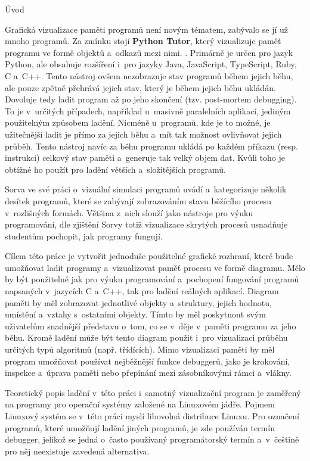 \documentclass[czech,bachelor,male,python,dept460,hidelinks]{diploma}						%
\newcommand{\parspace}[1][]{
	\ifthenelse{\isempty{#1}}{\vspace{0mm}}{\vspace{#1}}
	\par
}
\begin{document}
\begin{section}{Úvod}
	\parspace Grafická vizualizace paměti programů není novým tématem, zabývalo se jí už mnoho programů. Za zmínku stojí \textbf{Python Tutor}, který vizualizuje
	paměť programu ve formě objektů a~odkazů mezi nimi. \cite{GuoSIGCSE2013}.
	Primárně je určen pro jazyk Python, ale obsahuje rozšíření i~pro jazyky Java, JavaScript, TypeScript, Ruby, C a~C++.
	Tento nástroj ovšem nezobrazuje stav programů během jejich běhu, ale pouze zpětně přehrává jejich stav, který je během jejich běhu ukládán.
	Dovoluje tedy ladit program až po jeho skončení (tzv. post-mortem debugging). To je v~určitých případech, například u~masivně
	paralelních aplikací, jediným použitelným způsobem ladění. Nicméně u~programů, kde je to možné, je užitečnější ladit je přímo za jejich běhu a~mít
	tak možnost ovlivňovat jejich průběh. Tento nástroj navíc za běhu programu ukládá po každém příkazu (resp. instrukci) celkový stav paměti
	a~generuje tak velký objem dat. Kvůli toho je obtížné ho použít pro ladění větších a~složitějších programů.
	
	\parspace Sorva ve své práci o~vizuální simulaci programů \cite[140]{sorva2012visual} uvádí a~kategorizuje několik desítek programů,
	které se zabývají zobrazováním stavu běžícího procesu v~rozlišných formách. Většina z~nich slouží jako nástroje pro výuku programování,
	dle zjištění Sorvy totiž vizualizace skrytých procesů usnadňuje studentům pochopit, jak programy fungují. \cite[212]{sorva2012visual}
	
	\parspace Cílem této práce je vytvořit jednoduše použitelné grafické rozhraní, které bude umožňovat ladit programy a~vizualizovat paměť procesu
	ve formě diagramu. Mělo by být použitelné jak pro výuku programování a~pochopení fungování programů napsaných v~jazycích C a~C++, tak pro ladění reálných
	aplikací. Diagram paměti by měl zobrazovat jednotlivé objekty a~struktury, jejich hodnotu, umístění a~vztahy s~ostatními objekty.
	Tímto by měl poskytnout svým uživatelům snadnější představu o~tom, co se v~děje v~paměti programu za jeho běhu.
	Kromě ladění může být tento diagram použit i~pro vizualizaci průběhu určitých typů algoritmů (např. třídících). Mimo vizualizaci paměti by měl program
	umožňovat používat nejběžnější funkce debuggerů, jako je krokování, inspekce a~úprava paměti nebo přepínání mezi zásobníkovými rámci a~vlákny.
	
	\parspace Teoretický popis ladění v~této práci i~samotný vizualizační program je zaměřený na programy pro operační systémy založené na Linuxovém jádře.
	Pojmem Linuxový systém se v~této práci myslí libovolná distribuce Linuxu. Pro označení programů, které umožňují ladění jiných programů,
	je zde používán termín debugger, jelikož se jedná o~často používaný programátorský termín a~v~češtině pro něj neexistuje zavedená alternativa.


\end{section}
\end{document}
